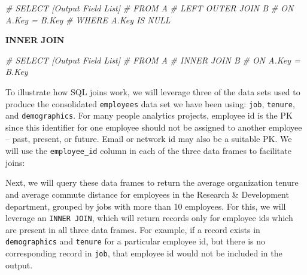 \documentclass[
]{book}
\newenvironment{Shaded}{\begin{snugshade}}{\end{snugshade}}
\newcommand{\CommentTok}[1]{\textcolor[rgb]{0.56,0.35,0.01}{\textit{#1}}}
\begin{document}
\begin{Shaded}
\begin{Highlighting}[]
\CommentTok{\#  SELECT [Output Field List]}
\CommentTok{\#  FROM A }
\CommentTok{\#  LEFT OUTER JOIN B}
\CommentTok{\#  ON A.Key = B.Key}
\CommentTok{\#  WHERE A.Key IS NULL}
\end{Highlighting}
\end{Shaded}

\textbf{INNER JOIN}

\begin{Shaded}
\begin{Highlighting}[]
\CommentTok{\#  SELECT [Output Field List]}
\CommentTok{\#  FROM A }
\CommentTok{\#  INNER JOIN B}
\CommentTok{\#  ON A.Key = B.Key}
\end{Highlighting}
\end{Shaded}

To illustrate how SQL joins work, we will leverage three of the data sets used to produce the consolidated \texttt{employees} data set we have been using: \texttt{job}, \texttt{tenure}, and \texttt{demographics}. For many people analytics projects, employee id is the PK since this identifier for one employee should not be assigned to another employee -- past, present, or future. Email or network id may also be a suitable PK. We will use the \texttt{employee\_id} column in each of the three data frames to facilitate joins:

Next, we will query these data frames to return the average organization tenure and average commute distance for employees in the Research \& Development department, grouped by jobs with more than 10 employees. For this, we will leverage an \texttt{INNER\ JOIN}, which will return records only for employee ids which are present in all three data frames. For example, if a record exists in \texttt{demographics} and \texttt{tenure} for a particular employee id, but there is no corresponding record in \texttt{job}, that employee id would not be included in the output.
\end{document}
